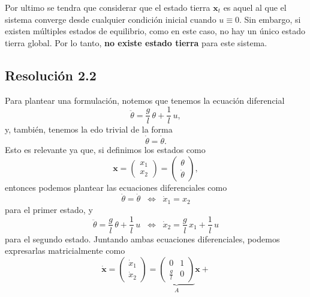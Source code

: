 \documentclass[
  11pt,
  letterpaper,
   addpoints,
  answers
  ]{exam}
\begin{document}
\begin{questions}
\begin{solution}
Por ultimo se tendra que considerar que el estado tierra $\mathbf{x}_t$ es aquel al que el sistema converge desde cualquier condición inicial cuando $u \equiv 0$. Sin embargo, si existen múltiples estados de equilibrio, como en este caso, no hay un único estado tierra global. Por lo tanto, \textbf{no existe estado tierra} para este sistema.

\subsection*{Resolución 2.2}

Para plantear una formulación, notemos que tenemos la ecuación diferencial
\begin{equation}
\ddot{\theta}=\frac{g}{l}\,\theta+\frac{1}{l}\,u,
\end{equation}
y, también, tenemos la edo trivial de la forma
\begin{equation}
\dot{\theta}=\dot{\theta}.
\end{equation}
Esto es relevante ya que, si definimos los estados como
\begin{equation}
\mathbf{x}=
\begin{pmatrix}
x_1\\[2pt]
x_2
\end{pmatrix}
=
\begin{pmatrix}
\theta\\[2pt]
\dot{\theta}
\end{pmatrix},
\end{equation}
entonces podemos plantear las ecuaciones diferenciales como
\begin{equation}
\dot{\theta}=\dot{\theta}\;\;\Leftrightarrow\;\;\dot{x}_1=x_2
\end{equation}
para el primer estado, y
\begin{equation}
\ddot{\theta}=\frac{g}{l}\,\theta+\frac{1}{l}\,u\;\;\Leftrightarrow\;\;\dot{x}_2=\frac{g}{l}\,x_1+\frac{1}{l}\,u
\end{equation}
para el segundo estado. Juntando ambas ecuaciones diferenciales, podemos expresarlas matricialmente como
\begin{equation}
\dot{\mathbf{x}}=
\begin{pmatrix}
\dot{x}_1\\[2pt]
\dot{x}_2
\end{pmatrix}
=
\underbrace{\begin{pmatrix}
0&1\\[2pt]
\frac{g}{l}&0
\end{pmatrix}}_{A}\mathbf{x}+

\end{equation}
\end{solution}
\end{questions}
\end{document}
